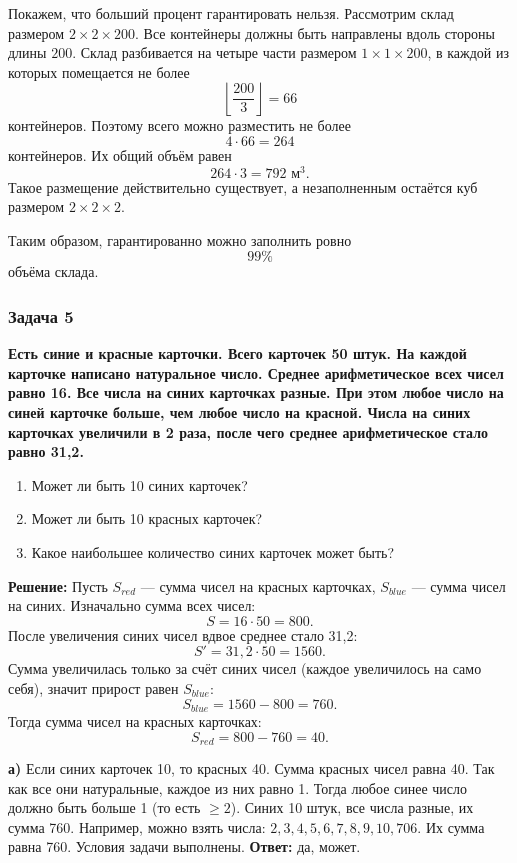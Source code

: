 \documentclass[12pt, a4paper]{article}
\begin{document}
Покажем, что больший процент гарантировать нельзя. Рассмотрим склад
размером $2\times2\times200$. Все контейнеры должны быть направлены вдоль
стороны длины $200$. Склад разбивается на четыре части размером
$1\times1\times200$, в каждой из которых помещается не более
\[
\left\lfloor\frac{200}{3}\right\rfloor=66
\]
контейнеров. Поэтому всего можно разместить не более
\[
4\cdot66=264
\]
контейнеров. Их общий объём равен
\[
264\cdot3=792\text{ м}^3.
\]
Такое размещение действительно существует, а незаполненным остаётся
куб размером $2\times2\times2$.

Таким образом, гарантированно можно заполнить ровно
\[
\boxed{99\%}
\]
объёма склада.

\subsubsection*{Задача 5}
\textbf{Есть синие и красные карточки. Всего карточек 50 штук. На каждой карточке написано натуральное число. Среднее арифметическое всех чисел равно 16. Все числа на синих карточках разные. При этом любое число на синей карточке больше, чем любое число на красной. Числа на синих карточках увеличили в 2 раза, после чего среднее арифметическое стало равно 31,2.}
\begin{enumerate}[label=\alph*)]
    \item Может ли быть 10 синих карточек?
    \item Может ли быть 10 красных карточек?
    \item Какое наибольшее количество синих карточек может быть?
\end{enumerate}

\textbf{Решение:}
Пусть $S_{red}$ — сумма чисел на красных карточках, $S_{blue}$ — сумма чисел на синих.
Изначально сумма всех чисел:
\[
S = 16 \cdot 50 = 800.
\]
После увеличения синих чисел вдвое среднее стало 31,2:
\[
S' = 31,2 \cdot 50 = 1560.
\]
Сумма увеличилась только за счёт синих чисел (каждое увеличилось на само себя), значит прирост равен $S_{blue}$:
\[
S_{blue} = 1560 - 800 = 760.
\]
Тогда сумма чисел на красных карточках:
\[
S_{red} = 800 - 760 = 40.
\]

\textbf{а)} Если синих карточек 10, то красных 40. Сумма красных чисел равна 40. Так как все они натуральные, каждое из них равно 1. 
Тогда любое синее число должно быть больше 1 (то есть $\ge 2$). Синих 10 штук, все числа разные, их сумма 760. 
Например, можно взять числа: $2, 3, 4, 5, 6, 7, 8, 9, 10, 706$. Их сумма равна 760.
Условия задачи выполнены.
\textbf{Ответ:} да, может.
\end{document}
